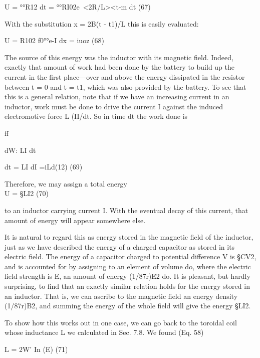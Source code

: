 \begin{equation}
\end{equation}
U = °°R12 dt = °°RI02e~<2R/L><t-m dt (67)

With the substitution x = 2B(t - t1)/L this is easily evaluated:

\begin{equation}
\end{equation}
U = R102 f0°°e-I dx = iuoz (68)

The source of this energy was the inductor with its magnetic field.
Indeed, exactly that amount of work had been done by the battery
to build up the current in the first place---over and above the energy
dissipated in the resistor between t = 0 and t = t1, which was also
provided by the battery. To see that this is a general relation, note
that if we have an increasing current in an inductor, work must be
done to drive the current I against the induced electromotive force
L (II/dt. So in time dt the work done is

ff

\begin{equation}
\end{equation}
dW: LI dt

dt = LI dI =iLd(12) (69)

Therefore, we may assign a total energy
\begin{equation}
\end{equation}
U = §LI2 (70)

to an inductor carrying current I. With the eventual decay of this
current, that amount of energy will appear somewhere else.

It is natural to regard this as energy stored in the magnetic field
of the inductor, just as we have described the energy of a charged
capacitor as stored in its electric field. The energy of a capacitor
charged to potential difference V is §CV2, and is accounted for by
assigning to an element of volume do, where the electric field strength
is E, an amount of energy (1/87r)E2 do. It is pleasant, but hardly
surprising, to find that an exactly similar relation holds for the energy
stored in an inductor. That is, we can ascribe to the magnetic field
an energy density (1/87r)B2, and summing the energy of the whole
field will give the energy §LI2.

To show how this works out in one case, we can go back to the
toroidal coil whose inductance L we calculated in Sec. 7.8. We
found (Eq. 58)

\begin{equation}
\end{equation}
L = 2W' In (E) (71)

